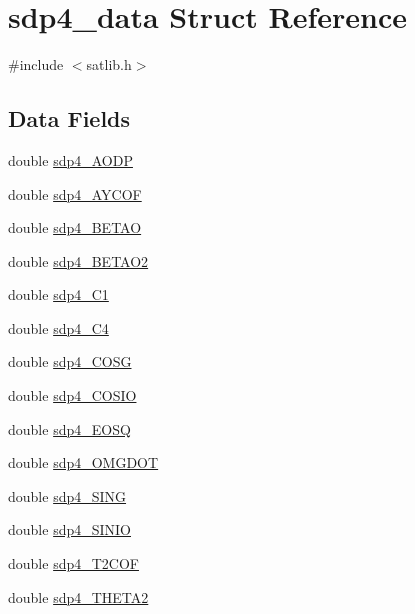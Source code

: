 \hypertarget{structsdp4__data}{\section{sdp4\-\_\-data Struct Reference}
\label{structsdp4__data}
}


{\ttfamily \#include $<$satlib.\-h$>$}

\subsection*{Data Fields}
\begin{DoxyCompactItemize}
\item 
double \hyperlink{structsdp4__data_afbedc47b304f6362de6f565f215b110e}{sdp4\-\_\-\-A\-O\-D\-P}
\item 
double \hyperlink{structsdp4__data_ae1233bb05e56bb56bdd4eb199fbe8585}{sdp4\-\_\-\-A\-Y\-C\-O\-F}
\item 
double \hyperlink{structsdp4__data_a7fcb25a5006f55ea58d8d945a4d7d2aa}{sdp4\-\_\-\-B\-E\-T\-A\-O}
\item 
double \hyperlink{structsdp4__data_a762d0086b20cf47ac525795bcc1fcf83}{sdp4\-\_\-\-B\-E\-T\-A\-O2}
\item 
double \hyperlink{structsdp4__data_a5313edbdab20b808c9a5e3826d1a2b4b}{sdp4\-\_\-\-C1}
\item 
double \hyperlink{structsdp4__data_a9c417b3f30e3ca928f74615a629dfe09}{sdp4\-\_\-\-C4}
\item 
double \hyperlink{structsdp4__data_a1fddbda1c938312a11e100c3d8e3154a}{sdp4\-\_\-\-C\-O\-S\-G}
\item 
double \hyperlink{structsdp4__data_ad15763f5ab1823c9ce28f4200ee4015d}{sdp4\-\_\-\-C\-O\-S\-I\-O}
\item 
double \hyperlink{structsdp4__data_aec407c0dbe694c85a247151032b1bf75}{sdp4\-\_\-\-E\-O\-S\-Q}
\item 
double \hyperlink{structsdp4__data_a13026e5e9ea296934b2da9b986cdabb6}{sdp4\-\_\-\-O\-M\-G\-D\-O\-T}
\item 
double \hyperlink{structsdp4__data_a17ac570d54ff789e9af6f1e5006fb7e2}{sdp4\-\_\-\-S\-I\-N\-G}
\item 
double \hyperlink{structsdp4__data_ae8a456f92f719964531d38f98d05feb5}{sdp4\-\_\-\-S\-I\-N\-I\-O}
\item 
double \hyperlink{structsdp4__data_af66ee94a547f47c649fa781d16e17cc6}{sdp4\-\_\-\-T2\-C\-O\-F}
\item 
double \hyperlink{structsdp4__data_a161d70530daa8bd4db20b923a1483d42}{sdp4\-\_\-\-T\-H\-E\-T\-A2}

\end{DoxyCompactItemize}
